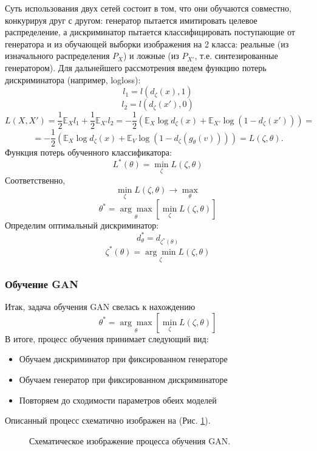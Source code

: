 			Суть использования двух сетей состоит в том, что они обучаются совместно, конкурируя друг с другом: генератор пытается имитировать целевое распределение, а дискриминатор пытается классифицировать поступающие от генератора и из обучающей выборки изображения на 2 класса: реальные (из изначального распределения $P_X$) и ложные (из $P_{X'}$, т.е. синтезированные генератором).
			Для дальнейшего рассмотрения введем функцию потерь дискриминатора (например, logloss):
			$$ l_1 = l(d_{\zeta}(x), 1) $$
			$$ l_2 = l(d_{\zeta}(x'), 0) $$
			$$ L(X, X') = \frac{1}{2} \mathbb{E}_{X} l_1 + \frac{1}{2} \mathbb{E}_{X'} l_2 = -\frac{1}{2} (\mathbb{E}_{X} \log d_{\zeta}(x) + \mathbb{E}_{X'} \log (1 - d_{\zeta}(x'))) = $$
			$$ =  -\frac{1}{2} (\mathbb{E}_{X} \log d_{\zeta}(x) + \mathbb{E}_{V} \log (1 - d_{\zeta}(g_{\theta}(v)))) = L(\zeta, \theta) .$$
			Функция потерь обученного классификатора:
			$$ L^*(\theta) = \underset{\zeta}{\min} L(\zeta, \theta) $$
			Соответственно,
			$$ \underset{\zeta}{\min} L(\zeta, \theta) \longrightarrow \underset{\theta}{\max} $$
			$$ \theta^* = \underset{\theta}{\arg\max} \left[ \underset{\zeta}{\min} L(\zeta, \theta) \right] $$
			Определим оптимальный дискриминатор:
			$$ d^*_{\theta} = d_{\zeta^*(\theta)} $$
			$$ \zeta^*(\theta) =  \underset{\zeta}{\arg\min} L(\zeta, \theta)$$
		\subsubsection{Обучение GAN}
			Итак, задача обучения GAN свелась к нахождению
			$$ \theta^* = \underset{\theta}{\arg\max} \left[ \underset{\zeta}{\min} L(\zeta, \theta) \right] $$
			В итоге, процесс обучения принимает следующий вид:
	
			\begin{itemize}
				\item Обучаем дискриминатор при фиксированном генераторе
				\item Обучаем генератор при фиксированном дискриминаторе
				\item Повторяем до сходимости параметров обеих моделей
			\end{itemize}
			Описанный процесс схематично изображен на (Рис. \ref{5-gan-training}).
	
			\begin{figure}[h!]
				\caption{Схематическое изображение процесса обучения GAN.}
				\label{5-gan-training}
			\end{figure}
	
